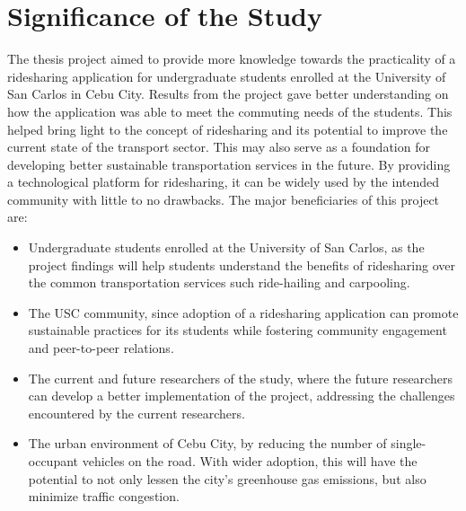 \section{Significance of the Study}
The thesis project aimed to provide more knowledge towards the practicality of a ridesharing application for undergraduate students enrolled at the University of San Carlos in Cebu City. Results from the project gave better understanding on how the application was able to meet the commuting needs of the students. This helped bring light to the concept of ridesharing and its potential to improve the current state of the transport sector. This may also serve as a foundation for developing better sustainable transportation services in the future. By providing a technological platform for ridesharing, it can be widely used by the intended community with little to no drawbacks. The major beneficiaries of this project are:
\begin{itemize}
    \item Undergraduate students enrolled at the University of San Carlos, as the project findings will help students understand the benefits of ridesharing over the common transportation services such ride-hailing and carpooling.
    \item The USC community, since adoption of a ridesharing application can promote sustainable practices for its students while fostering community engagement and peer-to-peer relations.
    \item The current and future researchers of the study, where the future researchers can develop a better implementation of the project, addressing the challenges encountered by the current researchers.
    \item The urban environment of Cebu City, by reducing the number of single-occupant vehicles on the road. With wider adoption, this will have the potential to not only lessen the city’s greenhouse gas emissions, but also minimize traffic congestion.
\end{itemize}





